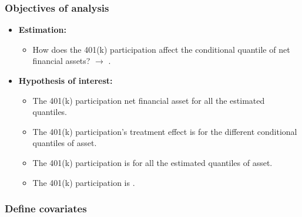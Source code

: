 \documentclass[11pt]{beamer}
\begin{document}
\begin{frame}
  \frametitle{Objectives of analysis}
\begin{itemize}

    \setlength\itemsep{1em}
  \item {\bf Estimation:}
    \begin{itemize}
  \item How does the 401(k) participation affect the  conditional quantile of net financial assets?
    $\rightarrow$ .
\end{itemize}

  \item {\bf Hypothesis of interest:}
    
    \begin{itemize}
    \setlength\itemsep{1em}
    \item {} The 401(k) participation 
      net financial asset for all the estimated quantiles.

  \item {} The 401(k) participation’s treatment effect is
     for the different conditional quantiles of asset.
	
  \item {} The 401(k) participation is  for all the estimated quantiles of asset.

  \item {} The 401(k) participation is .
\end{itemize}

\end{itemize}
\end{frame}

\begin{frame}
  \frametitle{Define covariates}
\end{frame}
\end{document}
